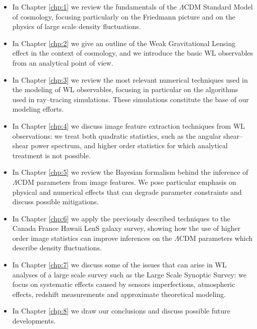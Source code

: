 \begin{itemize}

	\item In Chapter \ref{chp:1} we review the fundamentals of the $\Lambda$CDM Standard Model of cosmology, focusing particularly on the Friedmann picture and on the physics of large scale density fluctuations.
	
	\item In Chapter \ref{chp:2} we give an outline of the Weak Gravitational Lensing effect in the context of cosmology, and we introduce the basic WL observables from an analytical point of view.
	
	\item In Chapter \ref{chp:3} we review the most relevant numerical techniques used in the modeling of WL observables, focusing in particular on the algorithms used in ray--tracing simulations. These simulations constitute the base of our modeling efforts.  
	
	\item In Chapter \ref{chp:4} we discuss image feature extraction techniques from WL observations: we treat both quadratic statistics, such as the angular shear--shear power spectrum, and higher order statistics for which analytical treatment is not possible.
	
	\item In Chapter \ref{chp:5} we review the Bayesian formalism behind the inference of $\Lambda$CDM parameters from image features. We pose particular emphasis on physical and numerical effects that can degrade parameter constraints and discuss possible mitigations.
	
	\item In Chapter \ref{chp:6} we apply the previously described techniques to the Canada France Hawaii LenS galaxy survey, showing how the use of higher order image statistics can improve inferences on the $\Lambda$CDM parameters which describe density fluctuations. 
	
	\item In Chapter \ref{chp:7} we discuss some of the issues that can arise in WL analyses of a large scale survey such as the Large Scale Synoptic Survey: we focus on systematic effects caused by sensors imperfections, atmospheric effects, redshift measurements and approximate theoretical modeling.
	
	\item In Chapter \ref{chp:8} we draw our conclusions and discuss possible future developments.

\end{itemize}